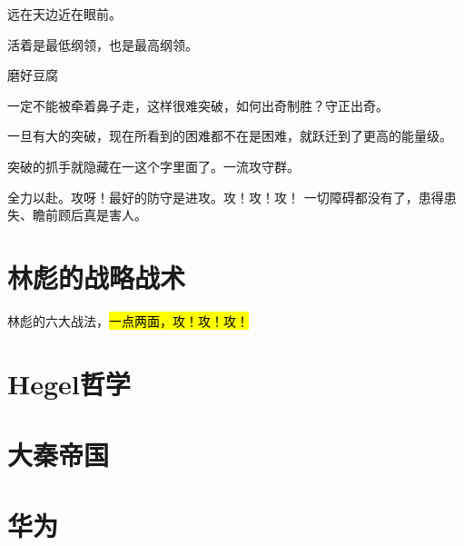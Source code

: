 远在天边近在眼前。

活着是最低纲领，也是最高纲领。

\hrulefill

磨好豆腐

一定不能被牵着鼻子走，这样很难突破，如何出奇制胜？守正出奇。

一旦有大的突破，现在所看到的困难都不在是困难，就跃迁到了更高的能量级。

突破的抓手就隐藏在一这个字里面了。一流攻守群。

全力以赴。攻呀！最好的防守是进攻。攻！攻！攻！
一切障碍都没有了，患得患失、瞻前顾后真是害人。

\section{林彪的战略战术}

林彪的六大战法，\hl{一点两面，攻！攻！攻！}

\section{Hegel哲学}

\section{大秦帝国}

\section{华为}
